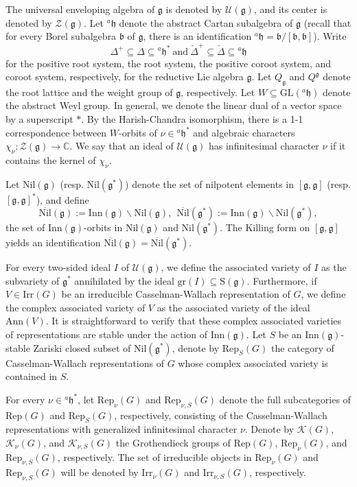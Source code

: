 \documentclass[12pt, a4paper]{amsart}
\numberwithin{equation}{section}
\newcommand{\BC}{{\mathbb {C}}}
\newcommand{\CK}{{\mathcal {K}}}
\newcommand{\CU}{{\mathcal {U}}}
\newcommand{\CZ}{{\mathcal {Z}}}
\newcommand{\RS}{{\mathrm {S}}}
\newcommand{\fb}{\mathfrak{b}}
\newcommand{\fg}{\mathfrak{g}}
\newcommand{\fh}{\mathfrak{h}}
\newcommand{\GL}{{\mathrm{GL}}}
\newcommand{\Irr}{{\mathrm{Irr}}}
\newcommand{\Inn}{{\mathrm{Inn}}}
\newcommand{\Ann}{{\mathrm{Ann}}}
\newcommand{\Rep}{{\mathrm{Rep}}}
\newcommand{\Nil}{{\mathrm{Nil}}}
\renewcommand{\bar}{\overline}
\begin{document}
The universal enveloping algebra of $\fg$ is denoted by $\CU(\fg)$, and its center is denoted by $\CZ(\fg)$. Let $^{a}\fh$ denote the abstract Cartan subalgebra of $\fg$ (recall that for every Borel subalgebra $\fb$ of $\fg$, there is an identification $^{a}\fh = \fb/[\fb,\fb]$). Write 
$$\Delta^+ \subseteq \Delta \subseteq {^{a}\fh^*} \ \textrm{and} \ \check{\Delta}^+ \subseteq \check{\Delta} \subseteq {^{a}\fh}$$
for the positive root system, the root system, the positive coroot system, and coroot system, respectively, for the reductive Lie algebra $\fg$. Let $Q_{\fg}$ and $Q^{\fg}$ denote the root lattice and the weight group of $\fg$, respectively. Let $W \subseteq \GL(^{a}\fh)$ denote the abstract Weyl group. In general, we denote the linear dual of a vector space by a superscript $*$. By the Harish-Chandra isomorphism, there is a 1-1 correspondence between $W$-orbits of $\nu \in {^{a}\fh^*}$ and algebraic characters $\chi_{\nu}:\CZ(\fg) \to \BC$. We say that an ideal of $\CU(\fg)$ has infinitesimal character $\nu$ if it contains the kernel of $\chi_{\nu}$.

Let $\Nil(\fg)$ (resp. $\Nil(\fg^*)$) denote the set of nilpotent elements in $[\fg,\fg]$ (resp. $[\fg,\fg]^*$), and define
\begin{equation}
   \bar{\Nil}(\fg) := \Inn(\fg) \backslash \Nil(\fg), \ \  \bar{\Nil}(\fg^*) := \Inn(\fg) \backslash \Nil(\fg^*),
\end{equation}
the set of $\Inn(\fg)$-orbits in $\Nil(\fg)$ and $\Nil(\fg^*)$. The Killing form on $[\fg,\fg]$ yields an identification $\bar{\Nil}(\fg) = \bar{\Nil}(\fg^*)$.

For every two-sided ideal $I$ of $\CU(\fg)$, we define the associated variety of $I$ as the subvariety of $\fg^*$ annihilated by the ideal $\mathrm{gr}(I) \subseteq \RS(\fg)$.  Furthermore, if $V \in \Irr(G)$ be an irreducible Casselman-Wallach representation of $G$, we define the complex associated variety of $V$ as the associated variety of the ideal $\Ann(V)$. It is straightforward to verify that these complex associated varieties of representations are stable under the action of $\Inn(\mathfrak{g})$. Let $S$ be an $\Inn(\fg)$-stable Zariski closed subset of $\Nil(\fg^*)$, denote by $\Rep_S(G)$ the category of Casselman-Wallach representations of $G$ whose complex associated variety is contained in $S$.

For every $\nu \in {^{a}\fh^*}$, let $\Rep_{\nu}(G)$ and $\Rep_{\nu,S}(G)$ denote the full subcategories of $\Rep(G)$ and $\Rep_S(G)$, respectively, consisting of the Casselman-Wallach representations with generalized infinitesimal character $\nu$. Denote by $\CK(G)$, $\CK_{\nu}(G)$, and $\CK_{\nu,S}(G)$ the Grothendieck groups of $\Rep(G)$, $\Rep_{\nu}(G)$, and $\Rep_{\nu,S}(G)$, respectively. The set of irreducible objects in $\Rep_{\nu}(G)$ and $\Rep_{\nu,S}(G)$ will be denoted by $\Irr_{\nu}(G)$ and $\Irr_{\nu,S}(G)$, respectively. 
\end{document}
